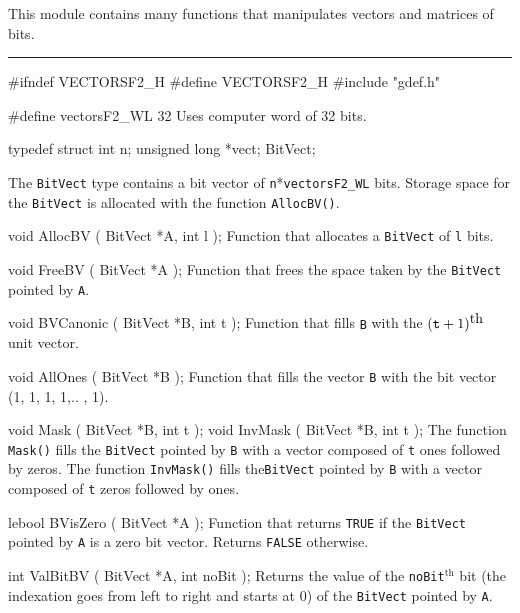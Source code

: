 This module contains many functions that manipulates vectors and
 matrices of bits.

\bigskip\hrule

\code\hide
#ifndef VECTORSF2_H
#define VECTORSF2_H
\endhide
#include "gdef.h"
\endcode
\code

#define vectorsF2_WL      32
\endcode
 \tab
Uses computer word of 32 bits.
 \endtab
\bigskip




\code

typedef struct{        
   int n;
   unsigned long *vect;
} BitVect;
\endcode

 \tab
The {\tt BitVect} type contains a bit vector of
 {\tt n}*{\tt vectorsF2\_WL} bits.  Storage space for
the {\tt BitVect} is allocated with the function {\tt AllocBV()}.
 \endtab
\code


void AllocBV ( BitVect *A,
               int l 
             );
\endcode
 \tab
Function that allocates a {\tt BitVect} of {\tt l} bits.
 \endtab
\code


void FreeBV ( BitVect *A 
            );
\endcode
 \tab
Function that frees the space taken by the {\tt BitVect} pointed by {\tt A}.
 \endtab
\code


void BVCanonic ( BitVect *B, 
                 int t
               );
\endcode
 \tab
Function that fills {\tt B} with the $({\tt t}+1)^{\mbox{th}}$ unit vector.
 \endtab
\code


void AllOnes ( BitVect *B
             );
\endcode
 \tab
Function that fills the vector {\tt B} with the bit vector (1, 1, 1, 1,.. , 1).
 \endtab
\code


void Mask ( BitVect *B,
            int t
          );
void InvMask ( BitVect *B,
               int t
             );
\endcode
 \tab
The function {\tt Mask()} fills the {\tt BitVect} pointed by {\tt B} with a vector composed of {\tt t} ones followed by zeros.
The function {\tt InvMask()} fills the{\tt BitVect} pointed by {\tt B} with a vector composed of {\tt t} zeros followed by ones.
 \endtab
\code


lebool BVisZero ( BitVect *A
                );
\endcode
 \tab
Function that returns {\tt TRUE} if the {\tt BitVect} pointed by {\tt A} is a zero bit vector.  Returns {\tt FALSE} otherwise.
\endtab
\code


int ValBitBV ( BitVect *A, 
               int noBit
             );                     
\endcode
 \tab
Returns the value of the {\tt noBit}$^{\mbox{th}}$ bit (the indexation goes from left to right and starts at 0) of the
{\tt BitVect} pointed by {\tt A}.
 \endtab
\code


